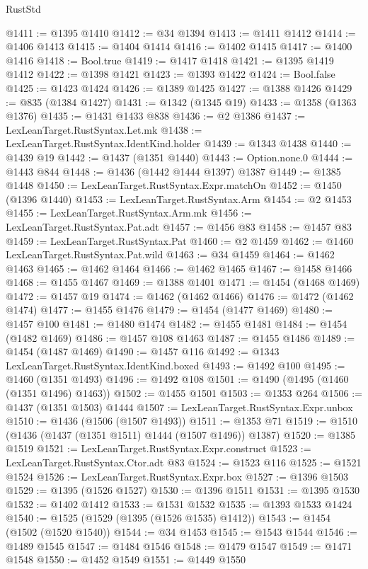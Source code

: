 \begin{lexlean}{RustStd}
\begin{coremodule}
{\begin{coremodule}
{{{{{{{{{{@1411 := @1395 @1410
@1412 := @34 @1394
@1413 := @1411 @1412
@1414 := @1406 @1413
@1415 := @1404 @1414
@1416 := @1402 @1415
@1417 := @1400 @1416
@1418 := Bool.true
@1419 := @1417 @1418
@1421 := @1395 @1419 @1412
@1422 := @1398 @1421
@1423 := @1393 @1422
@1424 := Bool.false
@1425 := @1423 @1424
@1426 := @1389 @1425
@1427 := @1388 @1426
@1429 := @835 (@1384 @1427)
@1431 := @1342 (@1345 @19)
@1433 := @1358 (@1363 @1376)
@1435 := @1431 @1433 @838
@1436 := @2 @1386
@1437 := LexLeanTarget.RustSyntax.Let.mk
@1438 := LexLeanTarget.RustSyntax.IdentKind.holder
@1439 := @1343 @1438
@1440 := @1439 @19
@1442 := @1437 (@1351 @1440)
@1443 := Option.none.{0}
@1444 := @1443 @844
@1448 := @1436 (@1442 @1444 @1397) @1387
@1449 := @1385 @1448
@1450 := LexLeanTarget.RustSyntax.Expr.matchOn
@1452 := @1450 (@1396 @1440)
@1453 := LexLeanTarget.RustSyntax.Arm
@1454 := @2 @1453
@1455 := LexLeanTarget.RustSyntax.Arm.mk
@1456 := LexLeanTarget.RustSyntax.Pat.adt
@1457 := @1456 @83
@1458 := @1457 @83
@1459 := LexLeanTarget.RustSyntax.Pat
@1460 := @2 @1459
@1462 := @1460 LexLeanTarget.RustSyntax.Pat.wild
@1463 := @34 @1459
@1464 := @1462 @1463
@1465 := @1462 @1464
@1466 := @1462 @1465
@1467 := @1458 @1466
@1468 := @1455 @1467
@1469 := @1388 @1401
@1471 := @1454 (@1468 @1469)
@1472 := @1457 @19
@1474 := @1462 (@1462 @1466)
@1476 := @1472 (@1462 @1474)
@1477 := @1455 @1476
@1479 := @1454 (@1477 @1469)
@1480 := @1457 @100
@1481 := @1480 @1474
@1482 := @1455 @1481
@1484 := @1454 (@1482 @1469)
@1486 := @1457 @108 @1463
@1487 := @1455 @1486
@1489 := @1454 (@1487 @1469)
@1490 := @1457 @116
@1492 := @1343 LexLeanTarget.RustSyntax.IdentKind.boxed
@1493 := @1492 @100
@1495 := @1460 (@1351 @1493)
@1496 := @1492 @108
@1501 := @1490 (@1495 (@1460 (@1351 @1496) @1463))
@1502 := @1455 @1501
@1503 := @1353 @264
@1506 := @1437 (@1351 @1503) @1444
@1507 := LexLeanTarget.RustSyntax.Expr.unbox
@1510 := @1436 (@1506 (@1507 @1493))
@1511 := @1353 @71
@1519 := @1510 (@1436 (@1437 (@1351 @1511) @1444 (@1507 @1496)) @1387)
@1520 := @1385 @1519
@1521 := LexLeanTarget.RustSyntax.Expr.construct
@1523 := LexLeanTarget.RustSyntax.Ctor.adt @83
@1524 := @1523 @116
@1525 := @1521 @1524
@1526 := LexLeanTarget.RustSyntax.Expr.box
@1527 := @1396 @1503
@1529 := @1395 (@1526 @1527)
@1530 := @1396 @1511
@1531 := @1395 @1530
@1532 := @1402 @1412
@1533 := @1531 @1532
@1535 := @1393 @1533 @1424
@1540 := @1525 (@1529 (@1395 (@1526 @1535) @1412))
@1543 := @1454 (@1502 (@1520 @1540))
@1544 := @34 @1453
@1545 := @1543 @1544
@1546 := @1489 @1545
@1547 := @1484 @1546
@1548 := @1479 @1547
@1549 := @1471 @1548
@1550 := @1452 @1549
@1551 := @1449 @1550
}}}}}}}}}}
\end{coremodule}}
\end{coremodule}
\end{lexlean}
